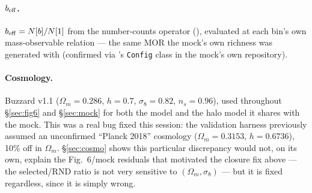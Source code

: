 \paragraph{$b_{\rm eff}$.} $b_{\rm eff}=N[b]/N[1]$ from the number-counts
operator (), evaluated at each bin's own
 mass-observable relation --- the same MOR the
mock's own richness was generated with (confirmed via
's \texttt{Config} class in
the mock's own repository).

\paragraph{Cosmology.} Buzzard v1.1 ($\Omega_m=0.286$, $h=0.7$,
$\sigma_8=0.82$, $n_s=0.96$), used throughout \S\ref{sec:fig6} and
\S\ref{sec:mock} for both the model and the halo model it shares with the
mock. This was a real bug fixed this session: the validation harness
previously assumed an unconfirmed ``Planck 2018'' cosmology
($\Omega_m=0.3153$, $h=0.6736$), 10\% off in $\Omega_m$. \S\ref{sec:cosmo}
shows this particular discrepancy would not, on its own, explain the
Fig.~6/mock residuals that motivated the closure fix above --- the
selected/RND ratio is not very sensitive to $(\Omega_m,\sigma_8)$ --- but
it is fixed regardless, since it is simply wrong.
